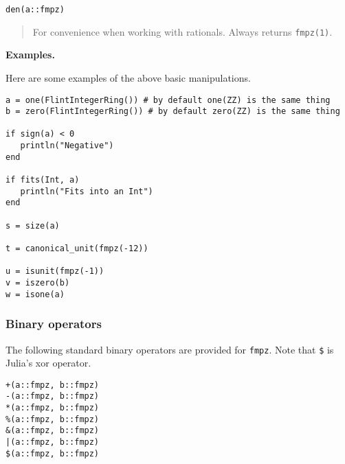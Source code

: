 \documentclass[a4paper,10pt]{article}
\newcommand{\code}{\lstinline}
\newcommand{\desc}[1]{\vspace{-3mm}\begin{quote}#1\end{quote}}
\begin{document}
\begin{lstlisting}
den(a::fmpz)
\end{lstlisting}

\desc{For convenience when working with rationals. Always returns \code{fmpz(1)}.}

\textbf{Examples.}

Here are some examples of the above basic manipulations.

\begin{lstlisting}
a = one(FlintIntegerRing()) # by default one(ZZ) is the same thing 
b = zero(FlintIntegerRing()) # by default zero(ZZ) is the same thing 

if sign(a) < 0
   println("Negative")
end

if fits(Int, a)
   println("Fits into an Int")
end

s = size(a)

t = canonical_unit(fmpz(-12))

u = isunit(fmpz(-1))
v = iszero(b)
w = isone(a)
\end{lstlisting}

\subsubsection{Binary operators}

The following standard binary operators are provided for \code{fmpz}. Note that \code{$} is Julia's
xor operator.

\begin{lstlisting}
+(a::fmpz, b::fmpz)
-(a::fmpz, b::fmpz)
*(a::fmpz, b::fmpz)
%(a::fmpz, b::fmpz)
&(a::fmpz, b::fmpz)
|(a::fmpz, b::fmpz)
$(a::fmpz, b::fmpz)
\end{lstlisting}
\end{document}
